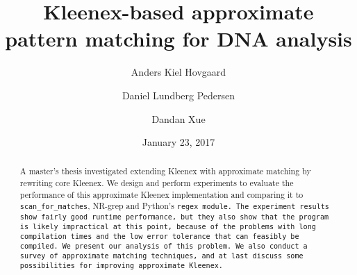 \documentclass[a4paper,11pt]{article}
\title{Kleenex-based approximate pattern matching for DNA analysis}
\author{Anders Kiel Hovgaard \and Daniel Lundberg Pedersen \and Dandan Xue}
\date{January 23, 2017}
\theoremstyle{definition}
\newcommand{\sfm}{\texttt{scan\_for\_matches}}
\begin{document}
\maketitle

\begin{abstract}
    A master's thesis investigated extending Kleenex with approximate matching
    by rewriting core Kleenex. We design and perform experiments to evaluate
    the performance of this approximate Kleenex implementation and comparing it
    to \sfm{}, NR-grep and Python's \tt{regex} module. The experiment results
    show fairly good runtime performance, but they also show that the program
    is likely impractical at this point, because of the problems with long
    compilation times and the low error tolerance that can feasibly be
    compiled. We present our analysis of this problem. We also conduct a survey
    of approximate matching techniques, and at last discuss some possibilities
    for improving approximate Kleenex.
\end{abstract}
\newpage

\tableofcontents
\newpage








\clearpage



\clearpage
\appendix

\end{document}

